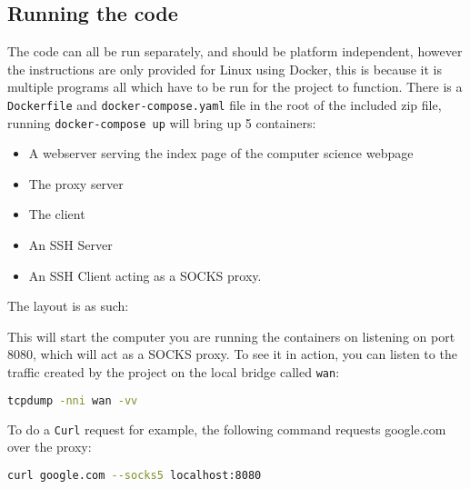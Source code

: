 \subsection{Running the code}
The code can all be run separately, and should be platform independent, however the instructions are only provided for Linux using Docker, this is because it is multiple programs all which have to be run for the project to function.
There is a \texttt{Dockerfile} and \texttt{docker-compose.yaml} file in the root of the included zip file, running \texttt{docker-compose up} will bring up 5 containers:
\begin{itemize}
    \item A webserver serving the index page of the computer science webpage
    \item The proxy server
    \item The client
    \item An SSH Server
    \item An SSH Client acting as a SOCKS proxy.
\end{itemize}
The layout is as such:
\begin{center}
\end{center}
This will start the computer you are running the containers on listening on port 8080, which will act as a SOCKS proxy.
To see it in action, you can listen to the traffic created by the project on the local bridge called \texttt{wan}:
\begin{lstlisting}[language=bash,numbers=none]
    tcpdump -nni wan -vv
\end{lstlisting}
To do a \texttt{Curl} request for example, the following command requests google.com over the proxy:
\begin{lstlisting}[language=bash,numbers=none]
    curl google.com --socks5 localhost:8080
\end{lstlisting}
